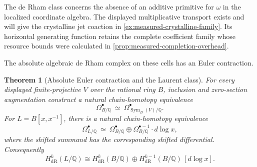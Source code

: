 \documentclass[11pt,a4paper]{article}
\numberwithin{algorithm}{section}
\numberwithin{equation}{section}
\newtheorem{theorem}{Theorem}[section]
\theoremstyle{definition}
\theoremstyle{remark}
\theoremstyle{plain}
\newcommand{\QQ}{\mathbb Q}
\newcommand{\Sym}{\operatorname{Sym}}
\theoremstyle{definition}
\theoremstyle{plain}
\begin{document}
The de Rham class concerns the absence of an additive
primitive for $\omega$ in the localized coordinate algebra. The displayed multiplicative transport exists
and will give the crystalline jet coaction in
\cref{ex:measured-crystalline-family}. Its horizontal generating
function retains the complete coefficient family whose resource bounds
were calculated in \cref{prop:measured-completion-overhead}.


The absolute algebraic de Rham complex on these cells has an Euler contraction.
\begin{theorem}[Absolute Euler contraction and the Laurent class]
\label{thm:absolute-euler}
For every displayed finite-projective $V$ over the rational ring
$B$, inclusion and zero-section augmentation construct a natural
chain-homotopy equivalence
\[
 \Omega^\bullet_{B/\QQ}
 \ \simeq\ \Omega^\bullet_{\Sym_B(V)/\QQ}.
\]
For $L=B[x,x^{-1}]$, there is a natural chain-homotopy
equivalence
\[
 \Omega^\bullet_{L/\QQ}\ \simeq\
 \Omega^\bullet_{B/\QQ}\oplus
 \Omega^{\bullet-1}_{B/\QQ}\cdot d\log x,
\]
where the shifted summand has the corresponding shifted
differential.  Consequently
\[
 H^k_{\mathrm{dR}}(L/\QQ)
 \cong H^k_{\mathrm{dR}}(B/\QQ)
 \oplus H^{k-1}_{\mathrm{dR}}(B/\QQ)\,[d\log x].
\]
\end{theorem}
\end{document}
